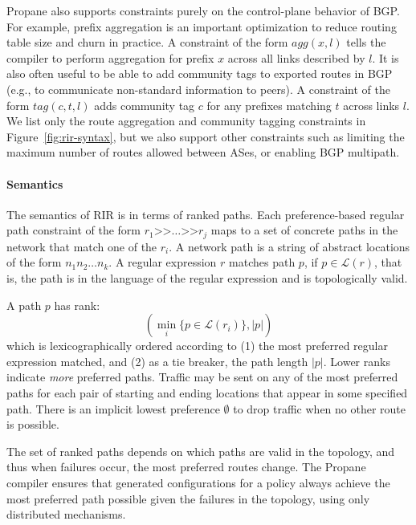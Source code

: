 \documentclass[10pt]{sigalternate052015}
\newcommand{\sysname}{{\small \sf Propane}\xspace}
\newcommand{\para}[1]{\paragraph*{\textbf{#1}}}
\newcommand{\set}[1]{\ensuremath{\{ #1 \} }}
\newcommand{\abs}[1]{\ensuremath{ \lvert #1 \rvert }}
\newcommand{\KW}[1]{\texttt{\small\bfseries{#1}}}
\newcommand{\Prefer}{\texttt{>>}}
\newcommand{\Link}{\texttt{->}}
\newcommand{\Agg}{\KW{agg}}
\newcommand{\In}{\KW{in}}
\newcommand{\Out}{\KW{out}}
\begin{document}
\sysname also supports constraints purely on the control-plane behavior of BGP. For example, prefix aggregation is an important optimization to reduce routing table size and churn in practice. A constraint of the form $agg(x,l)$ tells the compiler to perform aggregation for prefix $x$ across all links described by $l$. It is also often useful to be able to add community tags to exported routes in BGP (e.g., to communicate non-standard information to peers). A constraint of the form $tag(c,t,l)$ adds community tag $c$ for any prefixes matching $t$ across links $l$.
We list only the route aggregation and community tagging constraints in Figure~\ref{fig:rir-syntax}, but we also support other constraints such as limiting the maximum number of routes allowed between ASes, or enabling BGP multipath.


\para{Semantics}

The semantics of RIR is in terms of ranked paths. Each preference-based regular path constraint of the form $r_1 \Prefer \dots \Prefer r_j$ maps to a set of concrete paths in the network that match one of the $r_i$. A network path is a string of abstract locations of the form $n_1 n_2 \dots n_k$. A regular expression $r$ matches path $p$, if $p \in \mathcal{L}(r)$, that is, the path is in the language of the regular expression and is topologically valid.

A path $p$ has rank:
$$(\min_i \set{ p \in \mathcal{L}(r_i) }, \abs{p})$$
which is lexicographically ordered according to (1) the most preferred regular expression matched, and (2) as a tie breaker, the path length $\abs{p}$. Lower ranks indicate \emph{more} preferred paths. Traffic may be sent on any of the most preferred paths for each pair of starting and ending locations that appear in some specified path. There is an implicit lowest preference $\emptyset$ to drop traffic when no other route is possible.

The set of ranked paths depends on which paths are valid in the topology, and thus when failures occur, the most preferred routes change. The \sysname compiler ensures that generated configurations for a policy always achieve the most preferred path possible given the failures in the topology, using only distributed mechanisms.
\end{document}
